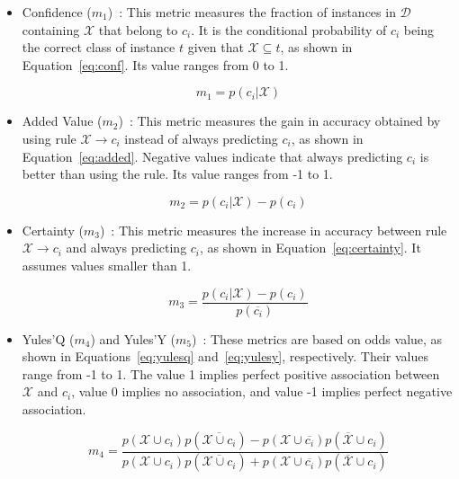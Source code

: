 \begin{itemize}
\item Confidence ($m_1$)~\cite{rules}: This metric measures the fraction of instances in $\mathcal{D}$ containing $\mathcal{X}$ that belong to $c_i$. It is the conditional probability of $c_i$ being the correct class of instance $t$ given that $\mathcal{X}\subseteq t$, as shown in Equation~\ref{eq:conf}. Its value ranges from 0 to 1.

\begin{equation}
\label{eq:conf}
m_1=p(c_i|\mathcal{X})
\end{equation}

\item Added Value ($m_2$)~\cite{hilderman}: This metric measures the gain in accuracy obtained by using rule $\mathcal{X}$$\xrightarrow{}$$c_i$ instead of always predicting $c_i$, as shown in Equation~\ref{eq:added}. Negative values indicate that always predicting $c_i$ is better than using the rule. Its value ranges from -1 to 1.

\begin{equation}
\label{eq:added}
m_2=p(c_i|\mathcal{X})-p(c_i)
\end{equation}

\item Certainty ($m_3$)~\cite{measures}: This metric measures the increase in accuracy between rule $\mathcal{X}\xrightarrow{}c_i$ and always predicting $c_i$, as shown in Equation~\ref{eq:certainty}. It assumes values smaller than 1.

\begin{equation}
\label{eq:certainty}
m_3=\frac{p(c_i|\mathcal{X})-p(c_i)}{p(\overline{c_i})}
\end{equation}

\item Yules'Q ($m_4$) and Yules'Y ($m_5$)~\cite{tan}: These metrics are based on odds value, as shown in Equations~\ref{eq:yulesq} and~\ref{eq:yulesy}, respectively. Their values range from -1 to 1. The value 1 implies perfect positive association between $\mathcal{X}$ and $c_i$, value 0 implies no association, and value -1 implies perfect negative association.

\begin{equation}
\label{eq:yulesq}
m_4=\frac{p(\mathcal{X}\cup c_i) p(\overline{\mathcal{X}\cup c_i})-p(\mathcal{X}\cup\overline{c_i}) p(\overline{\mathcal{X}}\cup c_i)}{p(\mathcal{X}\cup c_i) p(\overline{\mathcal{X}\cup c_i})+p(\mathcal{X}\cup\overline{c_i}) p(\overline{\mathcal{X}}\cup c_i)}
\end{equation}


\end{itemize}
